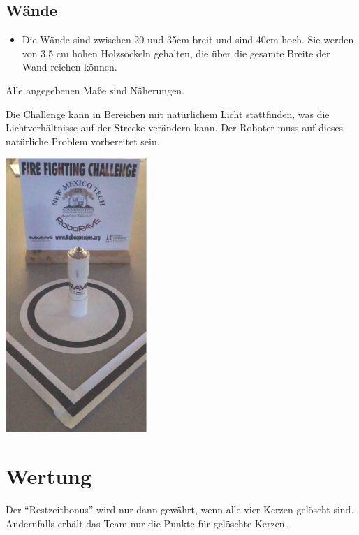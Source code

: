 \documentclass[a4paper,12pt]{article}
\begin{document}
\subsection{Wände}
\begin{itemize}
	\item Die Wände sind zwischen 20 und 35cm breit und sind 40cm hoch. Sie werden von 3,5 cm hohen Holzsockeln gehalten, die über die gesamte Breite der Wand reichen können.
\end{itemize}
\begin{center}
	Alle angegebenen Maße sind Näherungen.
\end{center}
Die Challenge kann in Bereichen mit natürlichem Licht stattfinden, was die Lichtverhältnisse auf der Strecke verändern kann. Der Roboter muss auf dieses natürliche
Problem vorbereitet sein.
\begin{center}
\includegraphics[width=0.4\textwidth]{candle.jpeg}
\end{center}
\section{Wertung}
Der "`Restzeitbonus"' wird nur dann gewährt, wenn alle vier Kerzen gelöscht sind.  Andernfalls erhält das Team nur die Punkte für gelöschte Kerzen.
\end{document}
